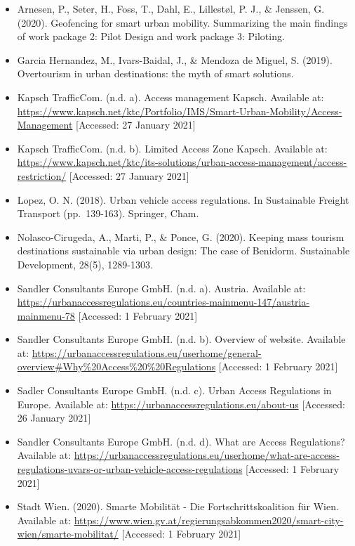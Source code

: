 \documentclass[
]{book}
\providecommand{\tightlist}{%
  \setlength{\itemsep}{0pt}\setlength{\parskip}{0pt}}
\begin{document}
\begin{itemize}
\tightlist
\item
  Arnesen, P., Seter, H., Foss, T., Dahl, E., Lillestøl, P. J., \& Jenssen, G. (2020). Geofencing for smart urban mobility. Summarizing the main findings of work package 2: Pilot Design and work package 3: Piloting.
\item
  Garcia Hernandez, M., Ivars-Baidal, J., \& Mendoza de Miguel, S. (2019). Overtourism in urban destinations: the myth of smart solutions.
\item
  Kapsch TrafficCom. (n.d. a). Access management \textbar{} Kapsch. Available at: \url{https://www.kapsch.net/ktc/Portfolio/IMS/Smart-Urban-Mobility/Access-Management} {[}Accessed: 27 January 2021{]}
\item
  Kapsch TrafficCom. (n.d. b). Limited Access Zone \textbar{} Kapsch. Available at: \url{https://www.kapsch.net/ktc/its-solutions/urban-access-management/access-restriction/} {[}Accessed: 27 January 2021{]}
\item
  Lopez, O. N. (2018). Urban vehicle access regulations. In Sustainable Freight Transport (pp.~139-163). Springer, Cham.
\item
  Nolasco-Cirugeda, A., Marti, P., \& Ponce, G. (2020). Keeping mass tourism destinations sustainable via urban design: The case of Benidorm. Sustainable Development, 28(5), 1289-1303.
\item
  Sandler Consultants Europe GmbH. (n.d. a). Austria. Available at: \url{https://urbanaccessregulations.eu/countries-mainmenu-147/austria-mainmenu-78} {[}Accessed: 1 February 2021{]}
\item
  Sandler Consultants Europe GmbH. (n.d. b). Overview of website. Available at: \url{https://urbanaccessregulations.eu/userhome/general-overview\#Why\%20Access\%20\%20Regulations} {[}Accessed: 1 February 2021{]}
\item
  Sadler Consultants Europe GmbH. (n.d. c). Urban Access Regulations in Europe. Available at: \url{https://urbanaccessregulations.eu/about-us} {[}Accessed: 26 January 2021{]}
\item
  Sandler Consultants Europe GmbH. (n.d. d). What are Access Regulations? Available at: \url{https://urbanaccessregulations.eu/userhome/what-are-access-regulations-uvars-or-urban-vehicle-access-regulations} {[}Accessed: 1 February 2021{]}
\item
  Stadt Wien. (2020). Smarte Mobilität - Die Fortschrittskoalition für Wien. Available at: \url{https://www.wien.gv.at/regierungsabkommen2020/smart-city-wien/smarte-mobilitat/} {[}Accessed: 1 February 2021{]}
\end{itemize}
\end{document}
